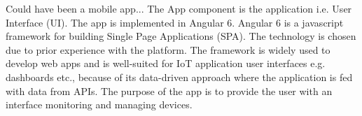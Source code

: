 Could have been a mobile app...
The App component is the application i.e. User Interface (UI). The app is implemented in Angular 6. Angular 6 is a javascript framework for building Single Page Applications (SPA). The technology is chosen due to prior experience with the platform. The framework is widely used to develop web apps and is well-suited for IoT application user interfaces e.g. dashboards etc., because of its data-driven approach where the application is fed with data from APIs. The purpose of the app is to provide the user with an interface monitoring and  managing devices.